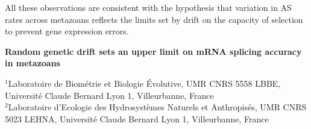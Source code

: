     All these observations are consistent with the hypothesis that variation in \acrshort{AS} rates across metazoans reflects the limits set by drift on the capacity of selection to prevent gene expression errors.

    \newpage
    

    
    
    \vspace*{10pt}
    
    \begin{center}
    \Large{\textbf{Random genetic drift sets an upper limit on mRNA splicing accuracy in metazoans}} \\
    \end{center}
    
    \begin{flushleft}
    
    \small
    \begin{center}
    $^{1}$Laboratoire de Biométrie et Biologie Évolutive, UMR CNRS 5558 LBBE, Université Claude Bernard Lyon 1, Villeurbanne, France\\
    $^{2}$Laboratoire d'Ecologie des Hydrosystèmes Naturels et Anthropisés, UMR CNRS 5023 LEHNA, Université Claude Bernard Lyon 1, Villeurbanne, France\\
    \end{center}
    \end{flushleft}

